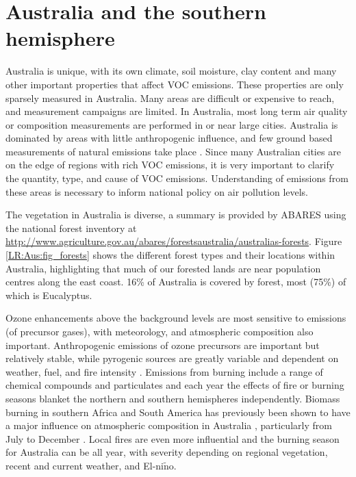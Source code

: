       
\section{Australia and the southern hemisphere}
\label{LR:Aus}
  
  Australia is unique, with its own climate, soil moisture, clay content and many other important properties that affect VOC emissions.
  These properties are only sparsely measured in Australia.
  Many areas are difficult or expensive to reach, and measurement campaigns are limited.
  In Australia, most long term air quality or composition measurements are performed in or near large cities.
  Australia is dominated by areas with little anthropogenic influence, and few ground based measurements of natural emissions take place \parencite{VanDerA2008}.
  Since many Australian cities are on the edge of regions with rich VOC emissions, it is very important to clarify the quantity, type, and cause of VOC emissions.
  Understanding of emissions from these areas is necessary to inform national policy on air pollution levels.
  
  The vegetation in Australia is diverse, a summary is provided by ABARES using the national forest inventory at  \url{http://www.agriculture.gov.au/abares/forestsaustralia/australias-forests}.
  Figure \ref{LR:Aus:fig_forests} shows the different forest types and their locations within Australia, highlighting that much of our forested lands are near population centres along the east coast.
  16\% of Australia is covered by forest, most (75\%) of which is Eucalyptus.
  
  
  Ozone enhancements above the background levels are most sensitive to emissions (of precursor gases), with meteorology, and atmospheric composition also important.
  Anthropogenic emissions of ozone precursors are important but relatively stable, while pyrogenic sources are greatly variable and dependent on weather, fuel, and fire intensity \parencite[e.g.][]{Lawson2017}. 
  Emissions from burning include a range of chemical compounds and particulates and each year the effects of fire or burning seasons blanket the northern and southern hemispheres independently.
  Biomass burning in southern Africa and South America has previously been shown to have a major influence on atmospheric composition in Australia \parencite{Oltmans2001, Gloudemans2006, Edwards2006}, particularly from July to December \parencite{Pak2003, Liu2016}.
  Local fires are even more influential and the burning season for Australia can be all year, with severity depending on regional vegetation, recent and current weather, and El-ni$\tilde{\textrm{n}}$o.
  
